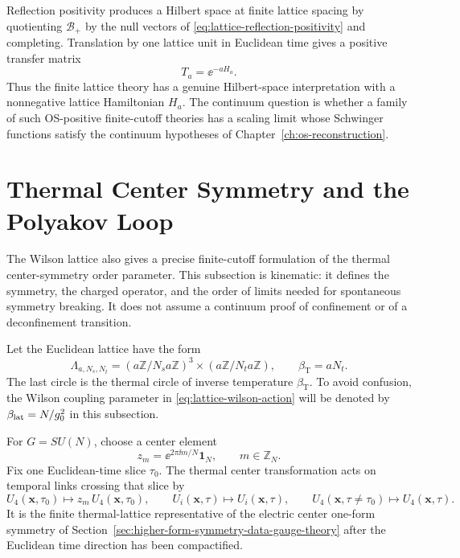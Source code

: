 Reflection positivity produces a Hilbert space at finite lattice spacing by
quotienting \(\mathcal B_+\) by the null vectors of
\eqref{eq:lattice-reflection-positivity} and completing.  Translation by one
lattice unit in Euclidean time gives a positive transfer matrix
\[
  T_a=\ee^{-aH_a}.
\]
Thus the finite lattice theory has a genuine Hilbert-space interpretation with
a nonnegative lattice Hamiltonian \(H_a\).  The continuum question is whether a
family of such OS-positive finite-cutoff theories has a scaling limit whose
Schwinger functions satisfy the continuum hypotheses of
Chapter~\ref{ch:os-reconstruction}.

\section{Thermal Center Symmetry and the Polyakov Loop}
\label{sec:lattice-center-polyakov-loop}

The Wilson lattice also gives a precise finite-cutoff formulation of the
thermal center-symmetry order parameter.  This subsection is kinematic: it
defines the symmetry, the charged operator, and the order of limits needed for
spontaneous symmetry breaking.  It does not assume a continuum proof of
confinement or of a deconfinement transition.

Let the Euclidean lattice have the form
\[
  \Lambda_{a,N_s,N_t}
  =
  (a\mathbb Z/N_s a\mathbb Z)^3
  \times
  (a\mathbb Z/N_t a\mathbb Z),
  \qquad
  \beta_{\mathrm T}=aN_t .
\]
The last circle is the thermal circle of inverse temperature
\(\beta_{\mathrm T}\).  To avoid confusion, the Wilson coupling parameter in
\eqref{eq:lattice-wilson-action} will be denoted by
\(\beta_{\rm lat}=N/g_0^2\) in this subsection.

For \(G=SU(N)\), choose a center element
\[
  z_m=\ee^{2\pi\ii m/N}\mathbf 1_N,
  \qquad m\in\mathbb Z_N .
\]
Fix one Euclidean-time slice \(\tau_0\).  The thermal center transformation
acts on temporal links crossing that slice by
\begin{equation}
  U_4(\mathbf x,\tau_0)\longmapsto z_m\,U_4(\mathbf x,\tau_0),
  \qquad
  U_i(\mathbf x,\tau)\longmapsto U_i(\mathbf x,\tau),
  \qquad
  U_4(\mathbf x,\tau\neq\tau_0)\longmapsto U_4(\mathbf x,\tau).
  \label{eq:lattice-center-slice-transformation}
\end{equation}
It is the finite thermal-lattice representative of the electric center
one-form symmetry of
Section~\ref{sec:higher-form-symmetry-data-gauge-theory} after the Euclidean
time direction has been compactified.

